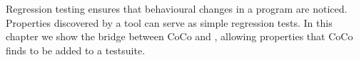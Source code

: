 Regression testing ensures that behavioural changes in a program are noticed.
Properties discovered by a tool can serve as simple regression tests.  In this
chapter we show the bridge between CoCo and \dejafu{}, allowing properties that
CoCo finds to be added to a \dejafu{} testsuite.
